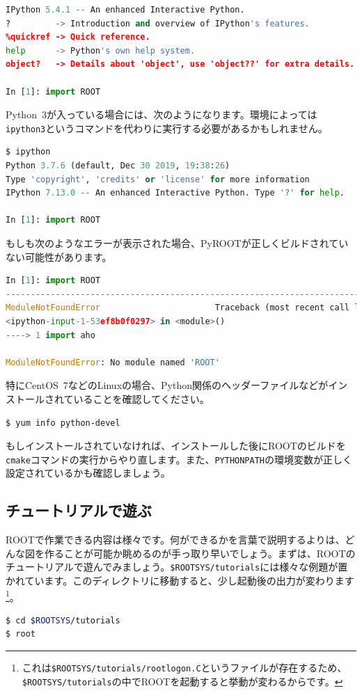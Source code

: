 {\begin{lstlisting}[language=python]
IPython 5.4.1 -- An enhanced Interactive Python.
?         -> Introduction and overview of IPython's features.
%quickref -> Quick reference.
help      -> Python's own help system.
object?   -> Details about 'object', use 'object??' for extra details.

In [1]: import ROOT
\end{lstlisting}

Python~3が入っている場合には、次のようになります。環境によっては\texttt{ipython3}というコマンドを代わりに実行する必要があるかもしれません。
\begin{lstlisting}[language=python]
$ ipython
Python 3.7.6 (default, Dec 30 2019, 19:38:26) 
Type 'copyright', 'credits' or 'license' for more information
IPython 7.13.0 -- An enhanced Interactive Python. Type '?' for help.

In [1]: import ROOT           
\end{lstlisting}
もしも次のようなエラーが表示された場合、PyROOTが正しくビルドされていない可能性があります。
\begin{lstlisting}[language=python]
In [1]: import ROOT
---------------------------------------------------------------------------
ModuleNotFoundError                       Traceback (most recent call last)
<ipython-input-1-53ef8b0f0297> in <module>()
----> 1 import aho

ModuleNotFoundError: No module named 'ROOT'
\end{lstlisting}
特にCentOS~7などのLinuxの場合、Python関係のヘッダーファイルなどがインストールされていることを確認してください。
\begin{lstlisting}[language=bash]
$ yum info python-devel
\end{lstlisting}
もしインストールされていなければ、インストールした後にROOTのビルドを\texttt{cmake}コマンドの実行からやり直します。また、\texttt{PYTHONPATH}の環境変数が正しく設定されているかも確認しましょう。

\subsection{チュートリアルで遊ぶ}
\label{subsec:tutorial}
ROOTで作業できる内容は様々です。何ができるかを言葉で説明するよりは、どんな図を作ることが可能か眺めるのが手っ取り早いでしょう。まずは、ROOTのチュートリアルで遊んでみましょう。\texttt{\$ROOTSYS/tutorials}には様々な例題が置かれています。このディレクトリに移動すると、少し起動後の出力が変わります\footnote{これは\texttt{\$ROOTSYS/tutorials/rootlogon.C}というファイルが存在するため、\texttt{\$ROOTSYS/tutorials}の中でROOTを起動すると挙動が変わるからです。}。
\begin{lstlisting}[language=bash]
$ cd $ROOTSYS/tutorials
$ root


\end{lstlisting}}
